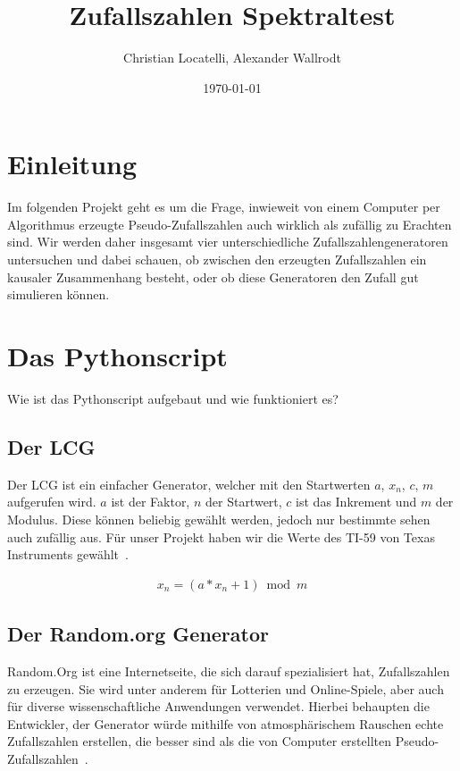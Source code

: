 \documentclass[12pt]{article}
\title{\textbf{Zufallszahlen Spektraltest}}
\author{Christian Locatelli, Alexander Wallrodt}
\date{\today}
\begin{document}
    \maketitle
    \clearpage

    \tableofcontents
    \listoftables
    \listoffigures

    \clearpage


    \section{Einleitung}\label{sec:Einleitung}
    Im folgenden Projekt geht es um die Frage, inwieweit von einem Computer per Algorithmus erzeugte Pseudo-Zufallszahlen
    auch wirklich als zufällig zu Erachten sind.
    Wir werden daher insgesamt vier unterschiedliche Zufallszahlengeneratoren untersuchen und dabei schauen,
    ob zwischen den erzeugten Zufallszahlen ein kausaler Zusammenhang besteht,
    oder ob diese Generatoren den Zufall gut simulieren können.



    \section{Das Pythonscript}\label{sec:das-pythonscript}
    Wie ist das Pythonscript aufgebaut und wie funktioniert es?

    \subsection{Der LCG}\label{subsec:der-lcg}
    Der LCG ist ein einfacher Generator, welcher mit den Startwerten $a$, $x_n$, $c$, $m$ aufgerufen wird.
    $a$ ist der Faktor, $n$ der Startwert, $c$ ist das Inkrement und $m$ der Modulus.
    Diese können beliebig gewählt werden, jedoch nur bestimmte sehen auch zufällig aus.
    Für unser Projekt haben wir die Werte des TI-59 von Texas Instruments gewählt~\cite{lcg}.

    \begin{align*}
    x_n = (a * x_n + 1) \bmod m
    \end{align*}

    \subsection{Der Random.org Generator}\label{subsec:der-random.org-generator}
    Random.Org ist eine Internetseite, die sich darauf spezialisiert hat, Zufallszahlen zu erzeugen.
    Sie wird unter anderem für Lotterien und Online-Spiele, aber auch für diverse wissenschaftliche
    Anwendungen verwendet.
    Hierbei behaupten die Entwickler, der Generator würde mithilfe von atmosphärischem
    Rauschen echte Zufallszahlen erstellen, die besser sind als die von Computer erstellten Pseudo-Zufallszahlen~\cite{random-org}.
\end{document}
